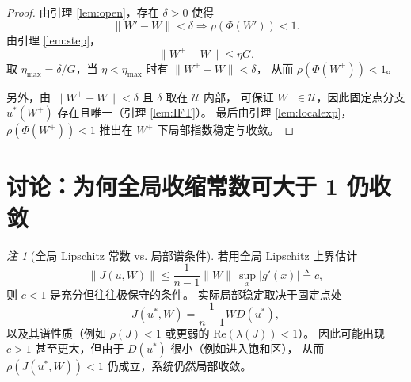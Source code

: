 \documentclass[11pt]{article}
\theoremstyle{plain}
\theoremstyle{remark}
\newtheorem{remark}{注}
\begin{document}
\begin{proof}
由引理 \ref{lem:open}，存在 $\delta>0$ 使得
\[
\|W'-W\|<\delta \Rightarrow \rho(\Phi(W'))<1.
\]
由引理 \ref{lem:step}，
\[
\|W^+-W\|\le \eta G.
\]
取 $\eta_{\max}=\delta/G$，当 $\eta<\eta_{\max}$ 时有 $\|W^+-W\|<\delta$，
从而 $\rho(\Phi(W^+))<1$。

另外，由 $\|W^+-W\|<\delta$ 且 $\delta$ 取在 $\mathcal U$ 内部，
可保证 $W^+\in\mathcal U$，因此固定点分支 $u^*(W^+)$ 存在且唯一（引理 \ref{lem:IFT}）。
最后由引理 \ref{lem:localexp}，$\rho(\Phi(W^+))<1$ 推出在 $W^+$ 下局部指数稳定与收敛。
\end{proof}

\section{讨论：为何全局收缩常数可大于 1 仍收敛}

\begin{remark}[全局 Lipschitz 常数 vs. 局部谱条件]
若用全局 Lipschitz 上界估计
\[
\|J(u,W)\| \le \frac{1}{n-1}\|W\|\,\sup_x |g'(x)| \triangleq c,
\]
则 $c<1$ 是充分但往往极保守的条件。
实际局部稳定取决于固定点处
\[
J(u^*,W)=\frac{1}{n-1}W D(u^*),
\]
以及其谱性质（例如 $\rho(J)<1$ 或更弱的 $\mathrm{Re}(\lambda(J))<1$）。
因此可能出现 $c>1$ 甚至更大，但由于 $D(u^*)$ 很小（例如进入饱和区），
从而 $\rho(J(u^*,W))<1$ 仍成立，系统仍然局部收敛。
\end{remark}
\end{document}
